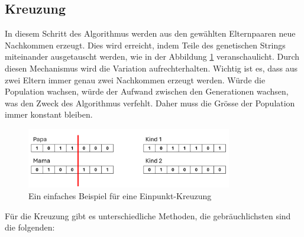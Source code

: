 %
%
%
%
\subsection{Kreuzung
\label{buch:paper:varalg:subsection:crossover}}
%
In diesem Schritt des Algorithmus werden aus den gewählten Elternpaaren 
neue Nachkommen erzeugt. Dies wird erreicht, indem Teile des genetischen 
Strings miteinander ausgetauscht werden, 
wie in der Abbildung \ref{fig:one_point_crossover} veranschaulicht.
Durch diesen Mechanismus wird die Variation aufrechterhalten. Wichtig ist es,
dass aus zwei Eltern immer genau zwei Nachkommen erzeugt werden. Würde
die Population wachsen, würde der Aufwand zwischen den Generationen
wachsen, was den Zweck des Algorithmus verfehlt. Daher muss die Grösse der
Population immer konstant bleiben.
\begin{figure}
	\centering
	\includegraphics[width=0.8\textwidth]{
		papers/varalg/images/teil3/05GeneticStringCross.png
	}
	\caption{Ein einfaches Beispiel für eine Einpunkt-Kreuzung}
	\label{fig:one_point_crossover}
\end{figure}
Für die Kreuzung gibt es unterschiedliche Methoden, die gebräuchlichsten sind
die folgenden:
